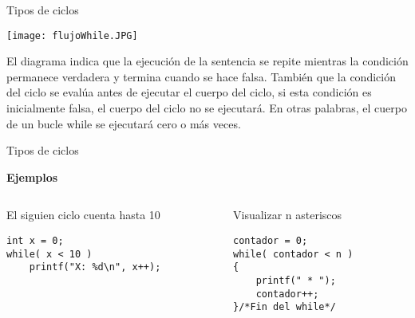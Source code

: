 \begin{frame}[t]{Tipos de ciclos}
    \vspace{-5mm}
    \begin{center}\texttt{[image: flujoWhile.JPG]}\vspace{-5mm}\end{center}
    \justify
    \hspace{5mm}
    El diagrama indica que la ejecución de la sentencia se repite mientras la condición permanece verdadera y termina cuando se hace falsa. También que la condición del ciclo se evalúa antes de ejecutar el cuerpo del ciclo, si esta condición es inicialmente falsa, el cuerpo del ciclo no se ejecutará. En otras palabras, el cuerpo de un bucle while se ejecutará cero o más veces.
\end{frame}


\begin{frame}[fragile]{Tipos de ciclos}

    \begin{center}\textbf{Ejemplos}\end{center}
    \begin{columns}
        \begin{column}{0.5 \textwidth}
            El siguien ciclo cuenta hasta 10
        \begin{lstlisting}
int x = 0;
while( x < 10 )
    printf("X: %d\n", x++);
\end{lstlisting}
        \end{column}
        \begin{column}{0.4 \textwidth}
    Visualizar n asteriscos
    \begin{lstlisting}
contador = 0;
while( contador < n )
{
    printf(" * ");
    contador++;
}/*Fin del while*/
\end{lstlisting}
        \end{column}
    \end{columns}
\end{frame}

